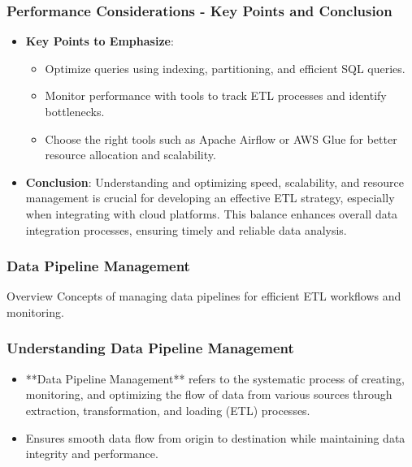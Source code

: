 \documentclass[aspectratio=169]{beamer}
\begin{document}
\begin{frame}[fragile]
    \frametitle{Performance Considerations - Key Points and Conclusion}
    \begin{itemize}
        \item \textbf{Key Points to Emphasize}:
        \begin{itemize}
            \item Optimize queries using indexing, partitioning, and efficient SQL queries.
            \item Monitor performance with tools to track ETL processes and identify bottlenecks.
            \item Choose the right tools such as Apache Airflow or AWS Glue for better resource allocation and scalability.
        \end{itemize}
        \item \textbf{Conclusion}:
        Understanding and optimizing speed, scalability, and resource management is crucial for developing an effective ETL strategy, especially when integrating with cloud platforms. This balance enhances overall data integration processes, ensuring timely and reliable data analysis.
    \end{itemize}
\end{frame}

\begin{frame}[fragile]
    \frametitle{Data Pipeline Management}
    \begin{block}{Overview}
        Concepts of managing data pipelines for efficient ETL workflows and monitoring.
    \end{block}
\end{frame}

\begin{frame}[fragile]
    \frametitle{Understanding Data Pipeline Management}
    \begin{itemize}
        \item **Data Pipeline Management** refers to the systematic process of 
        creating, monitoring, and optimizing the flow of data from various 
        sources through extraction, transformation, and loading (ETL) processes.
        \item Ensures smooth data flow from origin to destination while 
        maintaining data integrity and performance.
    \end{itemize}
\end{frame}
\end{document}
